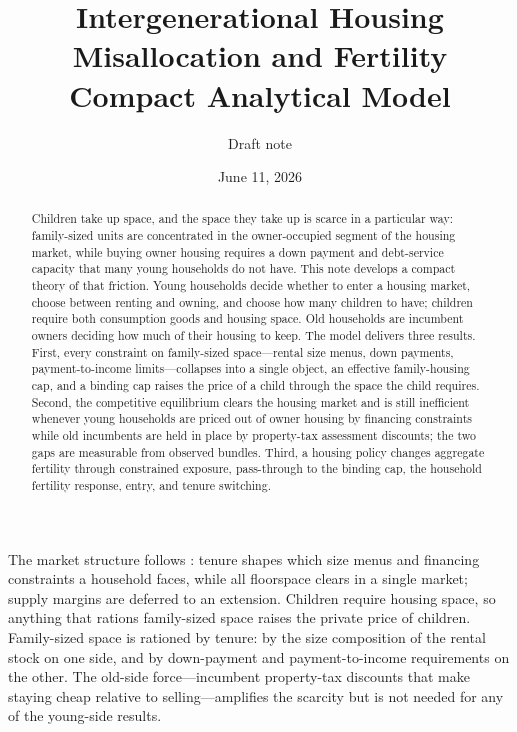 \documentclass[11pt]{article}
\title{Intergenerational Housing Misallocation and Fertility\\[-0.15em]
\large Compact Analytical Model}
\author{Draft note}
\date{June 11, 2026}
\newcommand{\1}{\mathbf 1}
\begin{document}
\maketitle

\begin{abstract}
Children take up space, and the space they take up is scarce in a particular way: family-sized units are concentrated in the owner-occupied segment of the housing market, while buying owner housing requires a down payment and debt-service capacity that many young households do not have. This note develops a compact theory of that friction. Young households decide whether to enter a housing market, choose between renting and owning, and choose how many children to have; children require both consumption goods and housing space. Old households are incumbent owners deciding how much of their housing to keep. The model delivers three results. First, every constraint on family-sized space---rental size menus, down payments, payment-to-income limits---collapses into a single object, an effective family-housing cap, and a binding cap raises the price of a child through the space the child requires. Second, the competitive equilibrium clears the housing market and is still inefficient whenever young households are priced out of owner housing by financing constraints while old incumbents are held in place by property-tax assessment discounts; the two gaps are measurable from observed bundles. Third, a housing policy changes aggregate fertility through constrained exposure, pass-through to the binding cap, the household fertility response, entry, and tenure switching.
\end{abstract}

The market structure follows \citet{coven2024}: tenure shapes which size menus and financing constraints a household faces, while all floorspace clears in a single market; supply margins are deferred to an extension. Children require housing space, so anything that rations family-sized space raises the private price of children. Family-sized space is rationed by tenure: by the size composition of the rental stock on one side, and by down-payment and payment-to-income requirements on the other. The old-side force---incumbent property-tax discounts that make staying cheap relative to selling---amplifies the scarcity but is not needed for any of the young-side results.

\clearpage
\tableofcontents
\clearpage

\end{document}
